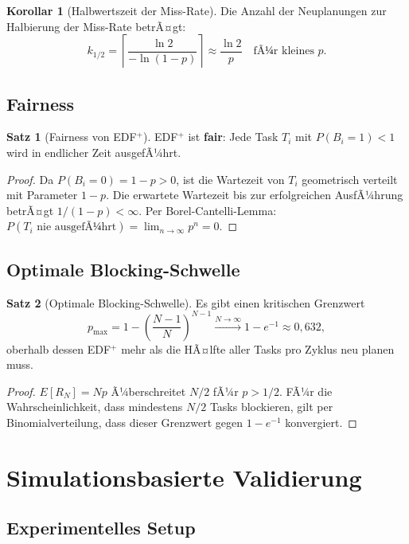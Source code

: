﻿\documentclass[a4paper,12pt]{article}
\theoremstyle{definition}
\newtheorem{satz}{Satz}
\newtheorem{korollar}{Korollar}
\begin{document}
	\begin{korollar}[Halbwertszeit der Miss-Rate]
		Die Anzahl der Neuplanungen zur Halbierung der Miss-Rate betrÃ¤gt:
		\[
		k_{1/2} = \left\lceil \frac{\ln 2}{-\ln(1-p)} \right\rceil \approx \frac{\ln 2}{p}
		\quad \text{fÃ¼r kleines } p.
		\]
	\end{korollar}
	
	\subsection{Fairness}
	
	\begin{satz}[Fairness von EDF$^+$]
		\label{satz:fairness}
		EDF$^+$ ist \textbf{fair}: Jede Task $T_i$ mit $P(B_i = 1) < 1$ wird in
		endlicher Zeit ausgefÃ¼hrt.
	\end{satz}
	
	\begin{proof}
		Da $P(B_i = 0) = 1-p > 0$, ist die Wartezeit von $T_i$ geometrisch verteilt
		mit Parameter $1-p$. Die erwartete Wartezeit bis zur erfolgreichen AusfÃ¼hrung
		betrÃ¤gt $1/(1-p) < \infty$. Per Borel-Cantelli-Lemma:
		$P(T_i \text{ nie ausgefÃ¼hrt}) = \lim_{n\to\infty} p^n = 0$.
	\end{proof}
	
	\subsection{Optimale Blocking-Schwelle}
	
	\begin{satz}[Optimale Blocking-Schwelle]
		Es gibt einen kritischen Grenzwert
		\[
		p_{\max} = 1 - \left(\frac{N-1}{N}\right)^{N-1} \xrightarrow{N\to\infty} 1 - e^{-1} \approx 0{,}632,
		\]
		oberhalb dessen EDF$^+$ mehr als die HÃ¤lfte aller Tasks pro Zyklus neu planen muss.
	\end{satz}
	
	\begin{proof}
		$E[R_N] = Np$ Ã¼berschreitet $N/2$ fÃ¼r $p > 1/2$. FÃ¼r die Wahrscheinlichkeit,
		dass mindestens $N/2$ Tasks blockieren, gilt per Binomialverteilung, dass dieser
		Grenzwert gegen $1-e^{-1}$ konvergiert.
	\end{proof}
	
	\section{Simulationsbasierte Validierung}
	
	\subsection{Experimentelles Setup}
	
\end{document}
